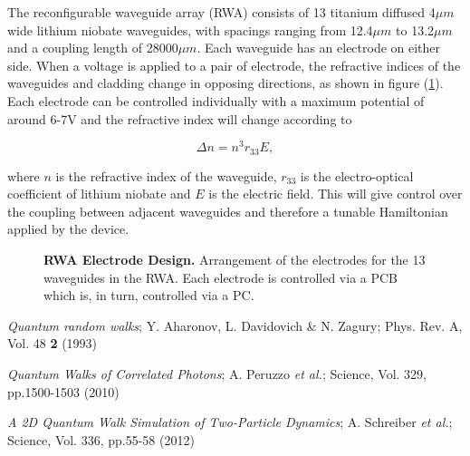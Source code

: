 \documentclass[11pt,a4paper]{article}
\begin{document}
The reconfigurable waveguide array (RWA) consists of 13 titanium diffused 4$\mu m$ wide lithium niobate waveguides, with spacings ranging from 12.4$\mu m$ to 13.2$\mu m$ and a coupling length of 28000$\mu m$. Each waveguide has an electrode on either side. When a voltage is applied to a pair of electrode, the refractive indices of the waveguides and cladding change in opposing directions, as shown in figure (\ref{Figure:RWA Electrode Design}). Each electrode can be controlled individually with a maximum potential of around 6-7V and the refractive index will change according to

\begin{equation}
\Delta n = n^3r_{33}E,
\end{equation}

\noindent where $n$ is the refractive index of the waveguide, $r_{33}$ is the electro-optical coefficient of lithium niobate and $E$ is the electric field. This will give control over the coupling between adjacent waveguides and therefore a tunable Hamiltonian applied by the device.

\begin{figure}[h]
\caption{\small \textbf{RWA Electrode Design.} Arrangement of the electrodes for the 13 waveguides in the RWA. Each electrode is controlled via a PCB which is, in turn, controlled via a PC.}
\label{Figure:RWA Electrode Design}
\end{figure}


\begin{thebibliography}{99}

\textit{Quantum random walks}; Y. Aharonov, L. Davidovich \& N. Zagury; Phys. Rev. A, Vol. 48 \textbf{2} (1993)

 \textit{Quantum Walks of Correlated Photons}; A. Peruzzo \textit{et al.}; Science, Vol. 329, pp.1500-1503 (2010)

 \textit{A 2D Quantum Walk Simulation of Two-Particle Dynamics}; A. Schreiber \textit{et al.}; Science, Vol. 336, pp.55-58 (2012)

\end{thebibliography}
\end{document}
